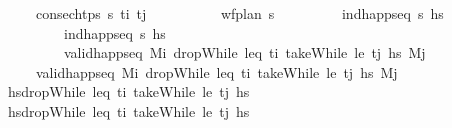 \begin{isabellebody}
\ \ \ \ \ {\isachardoublequoteopen}consec{\isacharunderscore}{\kern0pt}htps\ {\isasympi}s\ t\isactrlsub i\ t\isactrlsub j{\isachardoublequoteclose}\ \isanewline
\ \ \ \ \ \ \ \ \ {\isachardoublequoteopen}wf{\isacharunderscore}{\kern0pt}plan\ {\isasympi}s{\isachardoublequoteclose}\isanewline
\ \ \ \ \ \ \ \ \ {\isachardoublequoteopen}ind{\isacharunderscore}{\kern0pt}happ{\isacharunderscore}{\kern0pt}seq\ {\isasympi}s\ hs\ \isanewline
\ \ \ \ \ \ \ \ \ {\isachardoublequoteopen}ind{\isacharunderscore}{\kern0pt}happ{\isacharunderscore}{\kern0pt}seq\ {\isasympi}s\ hs\ \isanewline
\ \ \ \ \ \ \ \ \ {\isachardoublequoteopen}valid{\isacharunderscore}{\kern0pt}happ{\isacharunderscore}{\kern0pt}seq\ M\isactrlsub i\ {\isacharparenleft}{\kern0pt}dropWhile\ {\isacharparenleft}{\kern0pt}leq\ t\isactrlsub i{\isacharparenright}{\kern0pt}\ {\isacharparenleft}{\kern0pt}takeWhile\ {\isacharparenleft}{\kern0pt}le\ t\isactrlsub j{\isacharparenright}{\kern0pt}\ hs\ M\isactrlsub j{\isachardoublequoteclose}\isanewline
\ \ \ \ \ {\isachardoublequoteopen}valid{\isacharunderscore}{\kern0pt}happ{\isacharunderscore}{\kern0pt}seq\ M\isactrlsub i\ {\isacharparenleft}{\kern0pt}dropWhile\ {\isacharparenleft}{\kern0pt}leq\ t\isactrlsub i{\isacharparenright}{\kern0pt}\ {\isacharparenleft}{\kern0pt}takeWhile\ {\isacharparenleft}{\kern0pt}le\ t\isactrlsub j{\isacharparenright}{\kern0pt}\ hs\ M\isactrlsub j{\isachardoublequoteclose}\isanewline
%
\isadelimproof
\ \ %
\endisadelimproof
%
\isatagproof
{}\isamarkupfalse%
\ {\isacharminus}{\kern0pt}\isanewline
\ \ \ \ \isamarkupfalse%
\ {\isacharquery}{\kern0pt}hsdropWhile\ {\isacharparenleft}{\kern0pt}leq\ t\isactrlsub i{\isacharparenright}{\kern0pt}\ {\isacharparenleft}{\kern0pt}takeWhile\ {\isacharparenleft}{\kern0pt}le\ t\isactrlsub j{\isacharparenright}{\kern0pt}\ hs\isanewline
\ \ \ \ \isamarkupfalse%
\ {\isacharquery}{\kern0pt}hsdropWhile\ {\isacharparenleft}{\kern0pt}leq\ t\isactrlsub i{\isacharparenright}{\kern0pt}\ {\isacharparenleft}{\kern0pt}takeWhile\ {\isacharparenleft}{\kern0pt}le\ t\isactrlsub j{\isacharparenright}{\kern0pt}\ hs\isanewline

\end{isabellebody}
